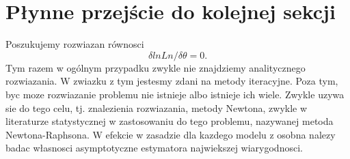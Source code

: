 \section{Płynne przejście do kolejnej sekcji}

\newpage
Poszukujemy rozwiazan równosci
$$ \delta ln Ln  / \delta \theta =  0.$$
Tym razem w ogólnym przypadku zwykle nie znajdziemy analitycznego rozwiazania. W
zwiazku z tym jestesmy zdani na metody iteracyjne. Poza tym, byc moze rozwiazanie problemu
nie istnieje albo istnieje ich wiele. Zwykle uzywa sie do tego celu, tj. znalezienia
rozwiazania, metody Newtona, zwykle w literaturze statystycznej w zastosowaniu do tego
problemu, nazywanej metoda Newtona-Raphsona. W efekcie w zasadzie dla kazdego modelu
z osobna nalezy badac własnosci asymptotyczne estymatora najwiekszej wiarygodnosci.